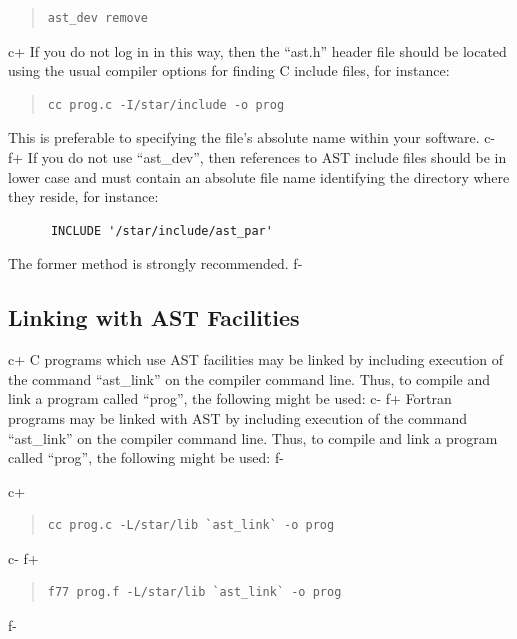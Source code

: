 \documentclass[twoside,11pt]{article}
\begin{document}
\begin{quote}
\small
\begin{verbatim}
ast_dev remove
\end{verbatim}
\normalsize
\end{quote}

c+
If you do not log in in this way, then the ``ast.h'' header file
should be located using the usual compiler options for finding C
include files, for instance:

\begin{quote}
\small
\begin{verbatim}
cc prog.c -I/star/include -o prog
\end{verbatim}
\normalsize
\end{quote}

This is preferable to specifying the file's absolute name within your
software.
c-
f+
If you do not use ``ast\_dev'', then references to AST include files
should be in lower case and must contain an absolute file name
identifying the directory where they reside, for instance:

\small
\begin{verbatim}
      INCLUDE '/star/include/ast_par'
\end{verbatim}
\normalsize

The former method is strongly recommended.
f-

\subsection{\label{ss:linking}Linking with AST Facilities}

c+
C programs which use AST facilities may be linked by including
execution of the command ``ast\_link'' on the compiler command
line. Thus, to compile and link a program called ``prog'', the
following might be used:
c-
f+
Fortran programs may be linked with AST by including execution of the
command ``ast\_link'' on the compiler command line. Thus, to compile
and link a program called ``prog'', the following might be used:
f-

c+
\begin{quote}
\small
\begin{verbatim}
cc prog.c -L/star/lib `ast_link` -o prog
\end{verbatim}
\normalsize
\end{quote}
c-
f+
\begin{quote}
\small
\begin{verbatim}
f77 prog.f -L/star/lib `ast_link` -o prog
\end{verbatim}
\normalsize
\end{quote}
f-
\end{document}

